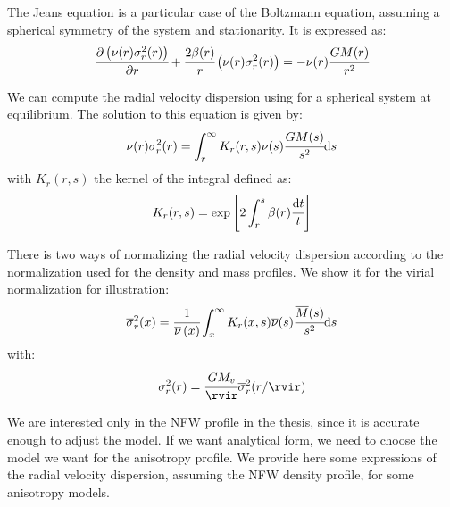 The Jeans equation is a particular case of the Boltzmann equation, assuming
a spherical symmetry of the system and stationarity. It is expressed as:
%
\begin{equation}
    \label{eq:jeans}
    \cfrac{{\partial} \left(\nu(r)\sigma_r^2(r)\right)}{{\partial} r} + \cfrac{2\beta(r)}{r}\left(\nu(r)\sigma_r^2(r)\right)=
    -\nu(r)\cfrac{GM(r)}{r^2}
\end{equation}

We can compute the radial velocity dispersion using 
for a spherical system at equilibrium. The solution to this equation is
given by:
%
\begin{equation}
    \nu(r)\sigma_r^2(r)=\int_r^\infty K_r(r,s)\nu(s)\cfrac{GM(s)}{s^2}{\rm{d}}{s}
\end{equation}
%
with $K_r(r,s)$ the kernel of the integral defined as:
%
\begin{equation}
    K_r(r,s)=\exp\left[2\int_r^s\beta(r)\cfrac{{\rm{d}}{t}}{t}\right]
\end{equation}

There is two ways of normalizing the radial velocity dispersion according to
the normalization used for the density and mass profiles. We show it for the
virial normalization for illustration:
%
\begin{equation}
    \label{eq:sigma_norm}
    \overline\sigma_r^2(x)= \cfrac{1}{\overline\nu \left(x\right)}
    \int_x^\infty K_r(x,s)\overline\nu(s)\cfrac{\overline{M}(s)}{s^2}{\rm{d}} s
\end{equation}
%
with:
%
\begin{equation}
    \sigma_r^2(r) = \cfrac{GM_v}{\rvir}\overline\sigma_r^2(r/\rvir)
\end{equation}

We are interested only in the NFW profile in the thesis, since it
is accurate enough to adjust the model. If we want analytical form, we need
to choose the model we want for the anisotropy profile. We provide here some
expressions of the radial velocity dispersion, assuming the NFW density
profile, for some anisotropy models.

\subsection{\citet{ML+05}}
\label{sub:ml05}

